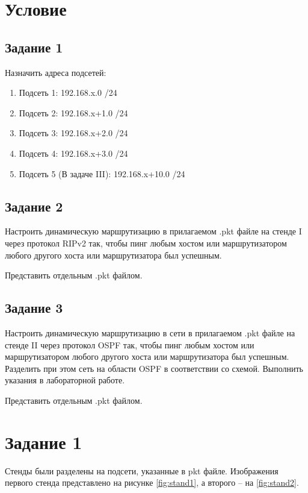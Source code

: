 \section{Условие}

\subsection{Задание 1}

Назначить адреса подсетей:

\begin{enumerate}
    \item Подсеть 1: 192.168.x.0 /24
    \item Подсеть 2: 192.168.x+1.0 /24
    \item Подсеть 3: 192.168.x+2.0 /24
    \item Подсеть 4: 192.168.x+3.0 /24
    \item Подсеть 5 (В задаче III): 192.168.x+10.0 /24
\end{enumerate}

\subsection{Задание 2}

Настроить динамическую маршрутизацию в прилагаемом .pkt файле на стенде I через протокол RIPv2 так, чтобы пинг любым хостом или маршрутизатором любого другого хоста или маршрутизатора был успешным.

Представить отдельным .pkt файлом. 

\subsection{Задание 3}

Настроить динамическую маршрутизацию в сети в прилагаемом .pkt файле на стенде II через протокол OSPF так, чтобы пинг любым хостом или маршрутизатором любого другого хоста или маршрутизатора был успешным. Разделить при этом сеть на области OSPF в соответствии со схемой. Выполнить указания в лабораторной работе.

Представить отдельным .pkt файлом.

\section{Задание 1}

Стенды были разделены на подсети, указанные в pkt файле. Изображения первого стенда представлено на рисунке \ref{fig:stand1}, а второго -- на \ref{fig:stand2}.

